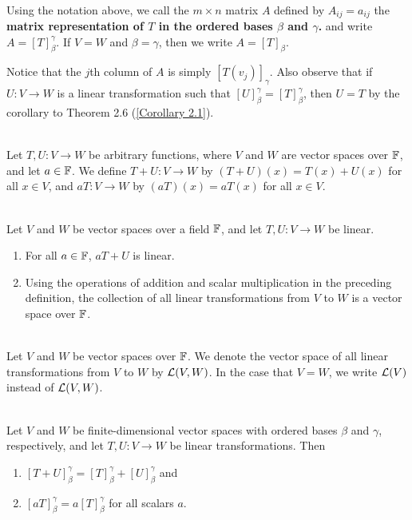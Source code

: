 \begin{definition}
	\hfill\\
	Using the notation above, we call the $m \times n$ matrix $A$ defined by $A_{ij} = a_{ij}$ the \textbf{matrix representation of $T$ in the ordered bases $\beta$ and $\gamma$.} and write $A = [T]_\beta^\gamma$. If $V = W$ and $\beta = \gamma$, then we write $A = [T]_\beta$.

	Notice that the $j$th column of $A$ is simply $[T(v_j)]_\gamma$. Also observe that if $U: V \to W$ is a linear transformation such that $[U]_\beta^\gamma = [T]_\beta^\gamma$, then $U=T$ by the corollary to Theorem 2.6 (\autoref{Corollary 2.1}).
\end{definition}

\begin{definition}
	\hfill\\
	Let $T,U: V \to W$ be arbitrary functions, where $V$ and $W$ are vector spaces over $\mathbb{F}$, and let $a \in \mathbb{F}$. We define $T + U: V \to W$ by $(T+U)(x) = T(x) + U(x)$ for all $x \in V$, and $aT: V \to W$ by $(aT)(x) = aT(x)$ for all $x \in V$.
\end{definition}

\begin{theorem}
	\hfill\\
	Let $V$ and $W$ be vector spaces over a field $\mathbb{F}$, and let $T,U: V \to W$ be linear.

	\begin{enumerate}
		\item For all $a \in \mathbb{F}$, $aT+U$ is linear.
		\item Using the operations of addition and scalar multiplication in the preceding definition, the collection of all linear transformations from $V$ to $W$ is a vector space over $\mathbb{F}$.
	\end{enumerate}
\end{theorem}

\begin{definition}
	\hfill\\
	Let $V$ and $W$ be vector spaces over $\mathbb{F}$. We denote the vector space of all linear transformations from $V$ to $W$ by $\mathcal{L}(V, W)$. In the case that $V = W$, we write $\mathcal{L}(V)$ instead of $\mathcal{L}(V, W)$.
\end{definition}

\begin{theorem}
	\hfill\\
	Let $V$ and $W$ be finite-dimensional vector spaces with ordered bases $\beta$ and $\gamma$, respectively, and let $T,U: V \to W$ be linear transformations. Then

	\begin{enumerate}
		\item $[T+U]_\beta^\gamma = [T]_\beta^\gamma + [U]_\beta^\gamma$ and
		\item $[aT]_\beta^\gamma = a[T]_\beta^\gamma$ for all scalars $a$.
	\end{enumerate}
\end{theorem}
